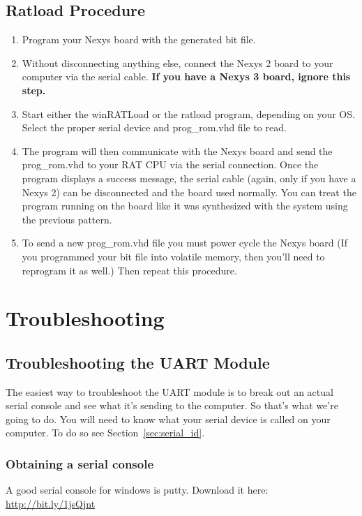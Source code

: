 \documentclass[notitlepage]{article}
\begin{document}
\subsection{Ratload Procedure}
\begin{enumerate}
\item Program your Nexys board with the generated bit file.

\item Without disconnecting anything else, connect the Nexys 2 board to your computer via the serial cable. \textbf{If you have a Nexys 3 board, ignore this step.}

\item Start either the winRATLoad or the ratload program, depending on your OS. Select the proper serial device and prog\_rom.vhd file to read.

\item The program will then communicate with the Nexys board and send the prog\_rom.vhd to your RAT CPU via the serial connection. Once the program displays a success message, the serial cable (again, only if you have a Nexys 2) can be disconnected and the board used normally. You can treat the program running on the board like it was synthesized with the system using the previous pattern.

\item To send a new prog\_rom.vhd file you must power cycle the Nexys board (If you programmed your bit file into volatile memory, then you'll need to reprogram it as well.) Then repeat this procedure.
\end{enumerate}

\section{Troubleshooting}
\label{sec:troubleshooting}
\subsection{Troubleshooting the UART Module}
The easiest way to troubleshoot the UART module is to break out an actual serial console and see what it's sending to the computer. So that's what we're going to do. You will need to know what your serial device is called on your computer. To do so see Section~\ref{sec:serial_id}.
\subsubsection{Obtaining a serial console}
A good serial console for windows is putty. Download it here: \url{http://bit.ly/1jsQjnt}
\end{document}
